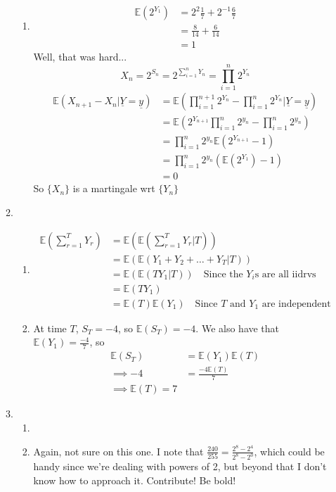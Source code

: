 \documentclass{article}
\begin{document}
\begin{enumerate}
\begin{enumerate}
\begin{enumerate}
\item
\begin{align*}
\mathbb{E}(2^{Y_1}) &= 2^2\frac{1}{7} + 2^{-1}\frac{6}{7}\\
&= \frac{8}{14} + \frac{6}{14}\\
&=1
\end{align*}
Well, that was hard...
$$
X_n = 2^{S_n} = 2^{\sum\limits_{i=1}^n Y_n} = \prod^n_{i=1}2^{Y_n}
$$
\begin{align*}
\mathbb{E}(X_{n+1}-X_n| \underline{Y} = \underline{y})& =
\mathbb{E}(\prod^{n+1}_{i=1}2^{Y_n} - \prod^n_{i=1}2^{Y_n} | \underline{Y} =
\underline{y})\\
&= \mathbb{E}(2^{Y_{n+1}}\prod^{n}_{i=1}2^{y_n} - \prod^n_{i=1}2^{y_n})\\
&= \prod^n_{i=1}2^{y_n} \mathbb{E}(2^{Y_{n+1}}-1)\\
&= \prod^n_{i=1}2^{y_n} (\mathbb{E}(2^{Y_1}) -1)\\
&= 0
\end{align*}
So $\{X_n\}$ is a martingale wrt $\{Y_n\}$

\end{enumerate}
\item
\begin{enumerate}
\item
\begin{align*}
\mathbb{E}(\sum^T_{r=1}Y_r) &= \mathbb{E}(\mathbb{E}(\sum^T_{r=1}Y_r|T))\\
&= \mathbb{E}(\mathbb{E}(Y_1+Y_2+\dots+Y_T|T))\\
&= \mathbb{E}(\mathbb{E}(TY_1|T)) \quad \mbox{Since the $Y_i$s are all
iidrvs}\\&= \mathbb{E}(TY_1)\\
&= \mathbb{E}(T)\mathbb{E}(Y_1) \quad \mbox{Since $T$ and $Y_1$ are
independent}\end{align*}
\item
At time $T$, $S_T = -4$, so $\mathbb{E}(S_T) = -4$. We also have that
$\mathbb{E}(Y_1) = \frac{-4}{7}$, so
\begin{align*}
\mathbb{E}(S_T)&=\mathbb{E}(Y_1)\mathbb{E}(T)\\
\implies -4 &= \frac{-4\mathbb{E}(T)}{7}\\
\implies \mathbb{E}(T) = 7
\end{align*}
\end{enumerate}

\item
\begin{enumerate}
\item
\item Again, not sure on this one. I note that $\frac{240}{255} =
\frac{2^8-2^4}{2^8-2^0}$, which could be handy since we're dealing with powers
of 2, but beyond that I don't know how to approach it. Contribute! Be bold!
\end{enumerate}


\end{enumerate}
\end{enumerate}
\end{document}
